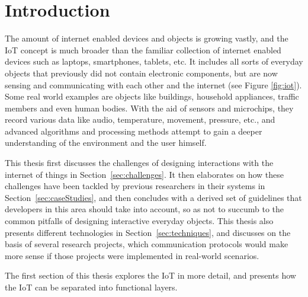 


\section{Introduction}
\label{sec:introduction}

The amount of internet enabled devices and objects is growing vastly, and the IoT concept is much broader than the familiar collection of internet enabled devices such as laptops, smartphones, tablets, etc.
It includes all sorts of everyday objects that previously did not contain electronic components, but are now sensing and communicating with each other and the internet (see Figure \ref{fig:iot}). Some real world examples are objects like buildings, household appliances, traffic members and even human bodies.
With the aid of sensors and microchips, they record various data like audio, temperature, movement, pressure, etc., and advanced algorithms and processing methods attempt to gain a deeper understanding of the environment and the user himself.

This thesis first discusses the challenges of designing interactions with the internet of things in Section~\ref{sec:challenges}. 
It then elaborates on how these challenges have been tackled by previous researchers in their systems in Section~\ref{sec:caseStudies}, and then concludes with a derived set of guidelines that developers in this area should take into account, so as not to succumb to the common pitfalls of designing interactive everyday objects.
This thesis also presents different technologies in Section~\ref{sec:techniques}, and discusses on the basis of several research projects, which communication protocols would make more sense if those projects were implemented in real-world scenarios.

The first section of this thesis explores the IoT in more detail, and presents how the IoT can be separated into functional layers.

